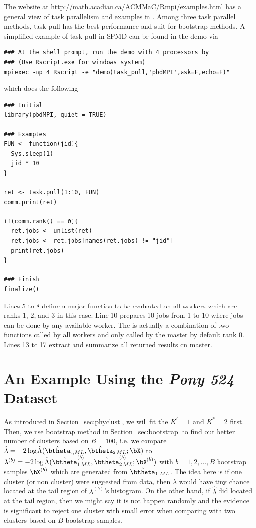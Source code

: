 The website at
\href{http://math.acadiau.ca/ACMMaC/Rmpi/examples.html}{
http://math.acadiau.ca/ACMMaC/Rmpi/examples.html}
has a general view of task parallelism and examples in .
Among three task parallel methods, task pull has the best performance and
suit for bootstrap methods.
A simplified example of task pull in SPMD can be found in the 
demo via
\begin{lstlisting}
### At the shell prompt, run the demo with 4 processors by
### (Use Rscript.exe for windows system)
mpiexec -np 4 Rscript -e "demo(task_pull,'pbdMPI',ask=F,echo=F)"
\end{lstlisting}
which does the following
\begin{lstlisting}[language=rr,title=Task Pull Example in \pkg{pbdMPI}]
### Initial
library(pbdMPI, quiet = TRUE)

### Examples
FUN <- function(jid){
  Sys.sleep(1)
  jid * 10
}

ret <- task.pull(1:10, FUN)
comm.print(ret)

if(comm.rank() == 0){
  ret.jobs <- unlist(ret)
  ret.jobs <- ret.jobs[names(ret.jobs) != "jid"]
  print(ret.jobs)
}

### Finish
finalize()
\end{lstlisting}
Lines 5 to 8 define a major function to be evaluated on all workers which are
ranks $1$, $2$, and $3$ in this case.
Line 10 prepares 10 jobs from 1 to 10 where jobs can be done by any
available worker. The  is actually a combination of two
functions  called by all workers and
 only called by the master by default rank 0.
Lines 13 to 17 extract and summarize all returned results on master.




\section{An Example Using the {\it Pony 524} Dataset}
\label{sec:ex_pony524}

As introduced in Section~\ref{sec:phyclust}, we will fit the $K^\prime = 1$ and
$K^* = 2$ first. Then, we use bootstrap method in Section~\ref{sec:bootstrap}
to find out better number of clusters based on $B = 100$,
i.e. we compare 
$\hat{\lambda} = -2\log \hat{\Lambda}
  (\hat{\btheta}_{1,ML}, \hat{\btheta}_{2\,ML}; \bX)$
to
$\lambda^{(b)} =
  -2\log \hat{\Lambda}
  (\hat{\btheta}^{(b)}_{1\,ML},
   \hat{\btheta}^{(b)}_{2\,ML}; \bX^{(b)})$
with $b = 1, 2, \ldots, B$ bootstrap samples $\bX^{(b)}$ which are generated
from $\hat{\btheta}_{1,ML}$.
The idea here is if one cluster (or non cluster) were suggested from data, then
$\hat{\lambda}$ would have tiny chance located at the tail region of
$\lambda^{(b)}$'s histogram. On the other hand, if $\hat{\lambda}$ did located
at the tail region, then we might say it is not happen randomly and the
evidence is significant to reject one cluster with small error when
comparing with two clusters based on $B$ bootstrap samples.


